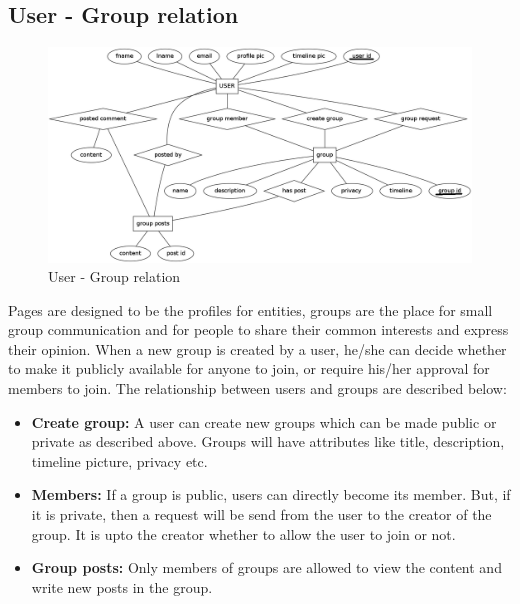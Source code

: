 \documentclass{article}
\begin{document}
\subsection{User - Group relation}
\begin{figure}[h!]
\centering
\includegraphics[scale=0.35]{user_groups.png}
\caption{User - Group relation}
\label{fig3}
\end{figure}
Pages are designed to be the profiles for entities, groups are the place for small group communication and for people to share their common interests and express their opinion. When a new group is created by a user, he/she can decide whether to make it publicly available for anyone to join, or require his/her approval for members to join. The relationship between users and groups are described below:
\begin{itemize}
\item \textbf{Create group:} A user can create new groups which can be made public or private as described above. Groups will have attributes like title, description, timeline picture, privacy etc.
\item \textbf{Members:} If a group is public, users can directly become its member. But, if it is private, then a request will be send from the user to the creator of the group. It is upto the creator whether to allow the user to join or not.
\item \textbf{Group posts:} Only members of groups are allowed to view the content and write new posts in the group.
\end{itemize}
\end{document}
